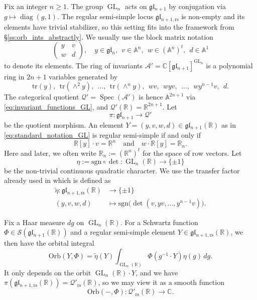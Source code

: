 \documentclass[reqno, 11pt]{amsart} %
\numberwithin{equation}{section}
\theoremstyle{plain}
\theoremstyle{definition}
\theoremstyle{remark}
\newcommand{\mr}{\mathrm}
\newcommand{\wt}{\widetilde}
\newcommand{\tr}{\mathrm{tr}}
\newcommand{\diag}{\operatorname{diag}}
\newcommand{\lr}{\longrightarrow}
\newcommand{\mbA}{\mathbb{A}}
\newcommand{\mbC}{\mathbb{C}}
\newcommand{\mbR}{\mathbb{R}}
\newcommand{\mcA}{\mathcal{A}}
\newcommand{\mcQ}{\mathcal{Q}}
\newcommand{\mcS}{\mathcal{S}}
\newcommand{\mfg}{\mathfrak{g}}
\newcommand{\mfl}{\mathfrak{l}}
\newcommand{\rs}{\mr{rs}}
\newcommand{\mfgl}{\mfg\mfl}
\newcommand{\bbR}{\mathbb R}
\DeclareMathOperator{\Spec}{Spec}
\DeclareMathOperator{\GL}{GL}
\newcommand{\Orb}{\mathrm{Orb}}
\begin{document}
Fix an integer $n\geq 1$. The group $\GL_n$ acts on $\mfgl_{n+1}$ by conjugation via $g\mapsto \diag(g,1)$. The regular semi-simple locus $\mfgl_{n+1,\rs}$ is non-empty and its elements have trivial stabilizer, so this setting fits into the framework from \S \ref{ss:orb_ints_abstractly}. We usually use the block matrix notation
\begin{equation}\label{eq:standard_notation_GL}
\begin{pmatrix}
y & v\\ w & d
\end{pmatrix},\quad y\in \mfgl_n,\ \ v\in \mbA^n,\ \ w\in (\mbA^n)^t,\ \ d\in \mbA^1
\end{equation}
to denote its elements. The ring of invariants $\mcA' = \mbC[\mfgl_{n+1}]^{\GL_n}$ is a polynomial ring in $2n+1$ variables generated by
\begin{equation}\label{eq:invariant_functions_GL}
\tr(y),\ \ \tr(\wedge^2 y),\ \ \ldots,\ \ \tr(\wedge^n y),\ \ wv,\ \ wyv,\ \ \ldots,\ \ wy^{n-1}v,\ \ d.
\end{equation}
The categorical quotient $\mcQ' = \Spec(\mcA')$ is hence $\mbA^{2n+1}$ via \eqref{eq:invariant_functions_GL}, and $\mcQ'(\mbR) = \mbR^{2n+1}$. Let
\begin{equation}\label{eq:quot_map_gl}
π:\mfgl_{n+1} \lr \mcQ'
\end{equation}
be the quotient morphism. An element $Y = (y, v, w, d) \in \mfgl_{n+1}(\mbR)$ as in \eqref{eq:standard_notation_GL} is regular semi-simple if and only if
$$\mbR[y]\cdot v = \mbR^n\quad \text{and}\quad w\cdot \mbR[y] = \mbR_n.$$
Here and later, we often write $\mbR_n := (\mbR^n)^t$ for the space of row vectors. Let $$η:= \mathrm{sgn} \circ \det \colon \GL_n(\mbR)\to \{\pm 1\}$$ be the non-trivial continuous quadratic character. We use the transfer factor already used in \cite{Zhang_GGP, MSY, Xue} which is defined as
\begin{equation}\label{eq:transfer_factor}
\begin{aligned}
\wt{η}:\mfgl_{n+1,\rs}(\mbR) & \lr \{\pm 1\}\\
(y, v, w, d) & \longmapsto \mathrm{sgn}\big(\det(v, yv, \ldots, y^{n-1}v)\big).
\end{aligned}
\end{equation}

 Fix a Haar measure $dg$ on $\GL_n(\bbR)$.
For a Schwartz function $Φ\in \mcS(\mfgl_{n+1}(\mbR))$ and a regular semi-simple element $Y\in \mfgl_{n+1,\rs}(\mbR)$, we then have the orbital integral
$$\Orb(Y, Φ) = \wt{η}(Y)\int_{\GL_n(\mbR)} Φ(g^{-1}\cdot Y) η(g)\, dg.$$
It only depends on the orbit $\GL_n(\mbR)\cdot Y$, and we have $π(\mfgl_{n+1,\rs}(\mbR)) = \mcQ'_\rs(\mbR)$, so we may view it as a smooth function
$$\Orb(-,Φ):\mcQ'_\rs(\mbR) \lr \mbC.$$
\end{document}
